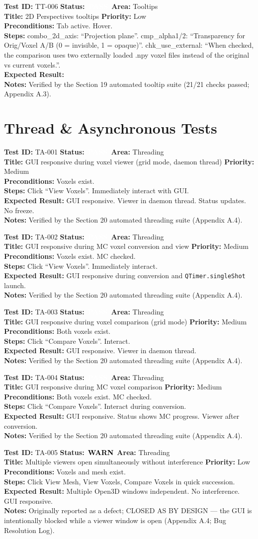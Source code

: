 \documentclass[12pt,a4paper]{article}
\newcommand{\statuspass}{\colorbox{statusgreen}{\textcolor{white}{\textbf{\,PASS\,}}}}
\newcommand{\statuswarn}{\colorbox{statusyellow}{\textcolor{black}{\textbf{\,WARN\,}}}}
\newcommand{\testcase}[9]{%
  \smallskip
  \noindent\textbf{Test ID:} #1 \hfill \textbf{Status:} #2 \hfill \textbf{Area:} #3 \\
  \textbf{Title:} #4 \hfill \textbf{Priority:} #5 \\[0.3em]
  \textbf{Preconditions:} #6 \\[0.3em]
  \textbf{Steps:} #7 \\[0.3em]
  \textbf{Expected Result:} #8 \\
  \textbf{Notes:} #9
  \smallskip
}
\begin{document}
\testcase{TT-006}{\statuspass}{Tooltips}{2D Perspectives tooltips}{Low}{Tab active. Hover.}{combo\_2d\_axis: ``Projection plane''. cmp\_alpha1/2: ``Transparency for Orig/Voxel A/B (0 = invisible, 1 = opaque)''. chk\_use\_external: ``When checked, the comparison uses two externally loaded .npy voxel files instead of the original vs current voxels.''.}{}{Verified by the Section 19 automated tooltip suite (21/21 checks passed; Appendix A.3).}



\section{Thread \& Asynchronous Tests}

\testcase{TA-001}{\statuspass}{Threading}{GUI responsive during voxel viewer (grid mode, daemon thread)}{Medium}{Voxels exist.}{Click ``View Voxels''. Immediately interact with GUI.}{GUI responsive. Viewer in daemon thread. Status updates. No freeze.}{Verified by the Section 20 automated threading suite (Appendix A.4).}


\testcase{TA-002}{\statuspass}{Threading}{GUI responsive during MC voxel conversion and view}{Medium}{Voxels exist. MC checked.}{Click ``View Voxels''. Immediately interact.}{GUI responsive during conversion and \texttt{QTimer.singleShot} launch.}{Verified by the Section 20 automated threading suite (Appendix A.4).}


\testcase{TA-003}{\statuspass}{Threading}{GUI responsive during voxel comparison (grid mode)}{Medium}{Both voxels exist.}{Click ``Compare Voxels''. Interact.}{GUI responsive. Viewer in daemon thread.}{Verified by the Section 20 automated threading suite (Appendix A.4).}


\testcase{TA-004}{\statuspass}{Threading}{GUI responsive during MC voxel comparison}{Medium}{Both voxels exist. MC checked.}{Click ``Compare Voxels''. Interact during conversion.}{GUI responsive. Status shows MC progress. Viewer after conversion.}{Verified by the Section 20 automated threading suite (Appendix A.4).}


\testcase{TA-005}{\statuswarn}{Threading}{Multiple viewers open simultaneously without interference}{Low}{Voxels and mesh exist.}{Click View Mesh, View Voxels, Compare Voxels in quick succession.}{Multiple Open3D windows independent. No interference. GUI responsive.}{Originally reported as a defect; CLOSED AS BY DESIGN --- the GUI is intentionally blocked while a viewer window is open (Appendix A.4; Bug Resolution Log).}
\end{document}
